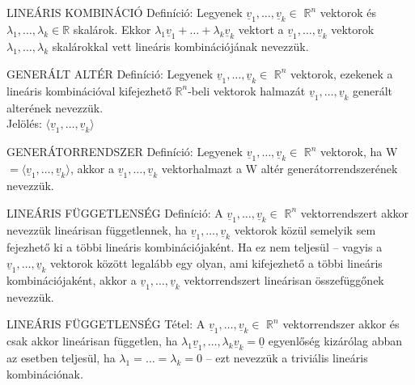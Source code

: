 \documentclass[]{article}
\newcommand{\R}{\mathbb{R}}
\newcommand{\Rn}[1]{$\mathbb{R}^{#1}$}
\newcommand{\Und}[1]{\underline{#1}}
\begin{document}
\begin{shaded}
LINEÁRIS KOMBINÁCIÓ Definíció: Legyenek $\Und{v}_1,\ldots,\Und{v}_k \in$ \Rn{n} vektorok és $\lambda_1,\ldots,\lambda_k \in \R$ skalárok. Ekkor $\lambda_1\Und{v}_1 + \ldots + \lambda_k\Und{v}_k$ vektort a $\Und{v}_1,\ldots,\Und{v}_k$ vektorok $\lambda_1,\ldots,\lambda_k$ skalárokkal vett lineáris kombinációjának nevezzük.
\end{shaded}
\begin{shaded}
GENERÁLT ALTÉR Definíció: Legyenek $\Und{v}_1,\ldots,\Und{v}_k \in$ \Rn{n} vektorok, ezekenek a lineáris kombinációval kifejezhető \Rn{n}-beli vektorok halmazát $\Und{v}_1,\ldots,\Und{v}_k$ generált alterének nevezzük.\\
Jelölés: $\langle\Und{v}_1,\ldots,\Und{v}_k\rangle$
\end{shaded}
\begin{shaded}
GENERÁTORRENDSZER Definíció: Legyenek $\Und{v}_1,\ldots,\Und{v}_k \in$ \Rn{n} vektorok, ha W $=\langle\Und{v}_1,\ldots,\Und{v}_k\rangle$, akkor a $\Und{v}_1,\ldots,\Und{v}_k$ vektorhalmazt a W altér generátorrendszerének nevezzük.
\end{shaded}
\begin{shaded}
LINEÁRIS FÜGGETLENSÉG Definíció: A $\Und{v}_1,\ldots,\Und{v}_k \in$ \Rn{n} vektorrendszert akkor nevezzük lineárisan függetlennek, ha $\Und{v}_1,\ldots,\Und{v}_k$ vektorok közül semelyik sem fejezhető ki a többi lineáris kombinációjaként. Ha ez nem teljesül -- vagyis a $\Und{v}_1,\ldots,\Und{v}_k$ vektorok között legalább egy olyan, ami kifejezhető a többi lineáris kombinációjaként, akkor a $\Und{v}_1,\ldots,\Und{v}_k$ vektorrendszert lineárisan összefüggőnek nevezzük.
\end{shaded}
\begin{framed}
LINEÁRIS FÜGGETLENSÉG Tétel: A $\Und{v}_1,\ldots,\Und{v}_k \in$ \Rn{n} vektorrendszer akkor és csak akkor lineárisan független, ha $\lambda_1\Und{v}_1,\ldots,\lambda_k\Und{v}_k = \Und{0}$ egyenlőség kizárólag abban az esetben teljesül, ha $\lambda_1 = \ldots = \lambda_k = 0$ -- ezt nevezzük a triviális lineáris kombinációnak.
\end{framed}
\end{document}
